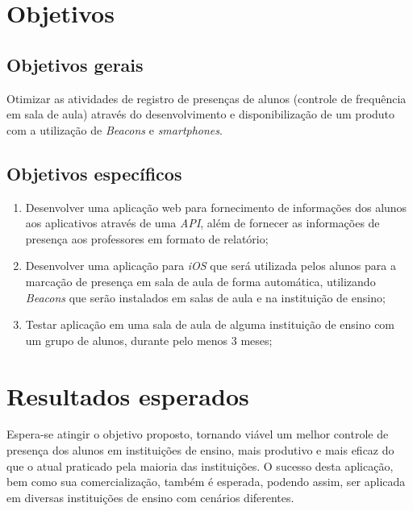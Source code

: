 \documentclass[
	12pt,
	oneside,
	a4paper,
	english,
	brazil,
]{abntex2}
\begin{document}

\chapter{Objetivos}

\section{Objetivos gerais}
Otimizar as atividades de registro de presenças de alunos (controle de frequência em sala de aula) através do desenvolvimento e disponibilização de um produto com a utilização de \emph{Beacons} e \emph{smartphones}.

\section{Objetivos específicos}
\begin{enumerate}
  \item Desenvolver uma aplicação web para fornecimento de informações dos alunos aos aplicativos através de uma \emph{API}, além de fornecer as informações de presença aos professores em formato de relatório;
  \item Desenvolver uma aplicação para \emph{iOS} que será utilizada pelos alunos para a marcação de presença em sala de aula de forma automática, utilizando \emph{Beacons} que serão instalados em salas de aula e na instituição de ensino;
  \item Testar aplicação em uma sala de aula de alguma instituição de ensino com um grupo de alunos, durante pelo menos 3 meses;
\end{enumerate}


\chapter{Resultados esperados}

Espera-se atingir o objetivo proposto, tornando viável um melhor controle de presença dos alunos em instituições de ensino, mais produtivo e mais eficaz do que o atual praticado pela maioria das instituições.
O sucesso desta aplicação, bem como sua comercialização, também é esperada, podendo assim, ser aplicada em diversas instituições de ensino com cenários diferentes.
\end{document}
